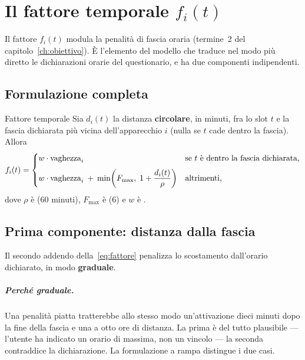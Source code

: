 \chapter{Il fattore temporale \texorpdfstring{$f_i(t)$}{fi(t)}}
\label{ch:fattore}

Il fattore $f_i(t)$ modula la penalità di fascia oraria (termine~2 del
capitolo~\ref{ch:obiettivo}). È l'elemento del modello che traduce nel modo più diretto le
dichiarazioni orarie del questionario, e ha due componenti indipendenti.

\section{Formulazione completa}

\begin{modelbox}{Fattore temporale}
Sia $d_i(t)$ la distanza \textbf{circolare}, in minuti, fra lo slot $t$ e la fascia dichiarata più
vicina dell'apparecchio $i$ (nulla se $t$ cade dentro la fascia). Allora
\begin{equation}
  f_i(t) =
  \begin{cases}
    w \cdot \operatorname{vaghezza}_i
    & \text{se } t \text{ è dentro la fascia dichiarata,}\\[6pt]
    w \cdot \operatorname{vaghezza}_i \;+\; \min\!\left( F_{\max},\; 1 + \dfrac{d_i(t)}{\rho} \right)
    & \text{altrimenti,}
  \end{cases}
  \label{eq:fattore}
\end{equation}
dove $\rho$ è  (60 minuti), $F_{\max}$ è
 (6) e $w$ è .
\end{modelbox}

\section{Prima componente: distanza dalla fascia}

Il secondo addendo della~\eqref{eq:fattore} penalizza lo scostamento dall'orario dichiarato, in
modo \textbf{graduale}.

\paragraph{Perché graduale.} Una penalità piatta tratterebbe allo stesso modo un'attivazione dieci
minuti dopo la fine della fascia e una a otto ore di distanza. La prima è del tutto plausibile ---
l'utente ha indicato un orario di massima, non un vincolo --- la seconda contraddice la
dichiarazione. La formulazione a rampa distingue i due casi.

